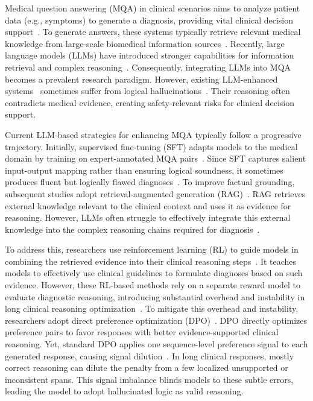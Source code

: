 \documentclass[a4paper,fleqn,doubleblind]{cas-sc}
\begin{document}
Medical question answering (MQA) in clinical scenarios aims to analyze patient data (e.g., symptoms) to generate a diagnosis, providing vital clinical decision support~\cite{jin2021disease, pal2022medmcqa}.
To generate answers, these systems typically retrieve relevant medical knowledge from large-scale biomedical information sources~\cite{jin2023medcpt, zakka2024almanac, xiong2024benchmarking, fan2025medeureka, deng2026medicalontologyir, li2026mmre}.
Recently, large language models (LLMs) have introduced stronger capabilities for information retrieval and complex reasoning~\cite{singhal2023large, nori2023capabilities, li2025ragreasoning}.
Consequently, integrating LLMs into MQA becomes a prevalent research paradigm.
However, existing LLM-enhanced systems~\cite{turpin2023unfaithful, lanham2023measuring, ji2023survey} sometimes suffer from logical hallucinations~\cite{huang2025surveyhallucination}. 
Their reasoning often contradicts medical evidence, creating safety-relevant risks for clinical decision support.

Current LLM-based strategies for enhancing MQA typically follow a progressive trajectory.
Initially, supervised fine-tuning (SFT) adapts models to the medical domain by training on expert-annotated MQA pairs~\cite{singhal2023large, zhang2023huatuogpt}. 
Since SFT captures salient input-output mapping rather than ensuring logical soundness, it sometimes produces fluent but logically flawed diagnoses~\cite{ji2023survey, li2023hallucination}.
To improve factual grounding, subsequent studies adopt retrieval-augmented generation (RAG)~\cite{zakka2024almanac, xiong2024benchmarking, jamia2025survey, li2026evidencerag}.
RAG retrieves external knowledge relevant to the clinical context and uses it as evidence for reasoning.
However, LLMs often struggle to effectively integrate this external knowledge into the complex reasoning chains required for diagnosis~\cite{liu2024lost, yoran2024making}.

To address this, researchers use reinforcement learning (RL) to guide models in combining the retrieved evidence into their clinical reasoning steps~\cite{nakano2021webgpt, zhou2022rainier, ipm2026srcr}.
It teaches models to effectively use clinical guidelines to formulate diagnoses based on such evidence.
However, these RL-based methods rely on a separate reward model to evaluate diagnostic reasoning, introducing substantial overhead and instability in long clinical reasoning optimization~\cite{rafailov2023direct, casper2023open}.
To mitigate this overhead and instability, researchers adopt direct preference optimization (DPO)~\cite{rafailov2023direct, savage2025finetuning, zhu2025mmedpo}.
DPO directly optimizes preference pairs to favor responses with better evidence-supported clinical reasoning.
Yet, standard DPO applies one sequence-level preference signal to each generated response, causing signal dilution~\cite{castricato2024suppressing, tang2024generalized}.
In long clinical responses, mostly correct reasoning can dilute the penalty from a few localized unsupported or inconsistent spans.
This signal imbalance blinds models to these subtle errors, leading the model to adopt hallucinated logic as valid reasoning.
\end{document}

